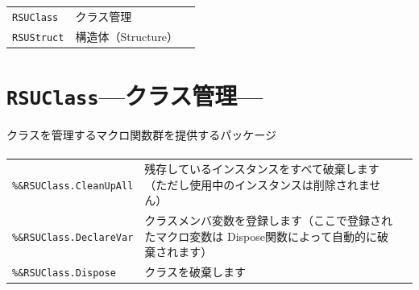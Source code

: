 \section{\DocStrTitlePackageListInCategory}
\begin{center}
\begin{xltabular}{\textwidth}{|p{2truecm}|X|p{2truecm}|}
\hline
\thead{\DocStrHeaderPackageName}&\thead{\DocStrHeaderPackagePurpose}&\thead{\DocStrRefto}\\
\hline
\hline
\texttt{RSUClass}&クラス管理&\\
\hline
\texttt{RSUStruct}&構造体（Structure）&\\
\hline
\end{xltabular}
\end{center}
\section{\texttt{RSUClass}\;---\;クラス管理\;---}\label{sec:RSUClass}
クラスを管理するマクロ関数群を提供するパッケージ
\paragraph{\DocStrTitleRDMPackageFunctionList}
\begin{center}
{\footnotesize
\begin{xltabular}{\textwidth}{|p{4truecm}|X|p{1.2truecm}|}
\hline
\thead{\DocStrHeaderFunctionName}&\thead{\DocStrDescription}&\thead{\DocStrRefto}\\
\hline
\hline
\texttt{\%\&RSUClass.CleanUpAll}&残存しているインスタンスをすべて破棄します（ただし使用中のインスタンスは削除されません）&\\
\hline
\texttt{\%\&RSUClass.DeclareVar}&クラスメンバ変数を登録します（ここで登録されたマクロ変数は Dispose関数によって自動的に破棄されます）&\\
\hline
\texttt{\%\&RSUClass.Dispose}&クラスを破棄します&\\
\hline
\end{xltabular}
}
\end{center}
